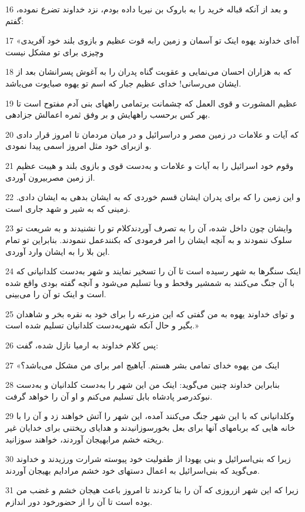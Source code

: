 \par 16 و بعد از آنکه قباله خرید را به باروک بن نیریا داده بودم، نزد خداوند تضرع نموده، گفتم:
\par 17 «آه‌ای خداوند یهوه اینک تو آسمان و زمین رابه قوت عظیم و بازوی بلند خود آفریدی وچیزی برای تو مشکل نیست
\par 18 که به هزاران احسان می‌نمایی و عقوبت گناه پدران را به آغوش پسرانشان بعد از ایشان می‌رسانی! خدای عظیم جبار که اسم تو یهوه صبایوت می‌باشد.
\par 19 عظیم المشورت و قوی العمل که چشمانت برتمامی راههای بنی آدم مفتوح است تا بهر کس برحسب راههایش و بر وفق ثمره اعمالش جزادهی.
\par 20 که آیات و علامات در زمین مصر و دراسرائیل و در میان مردمان تا امروز قرار دادی و ازبرای خود مثل امروز اسمی پیدا نمودی.
\par 21 وقوم خود اسرائیل را به آیات و علامات و به‌دست قوی و بازوی بلند و هیبت عظیم از زمین مصربیرون آوردی.
\par 22 و این زمین را که برای پدران ایشان قسم خوردی که به ایشان بدهی به ایشان دادی. زمینی که به شیر و شهد جاری است.
\par 23 وایشان چون داخل شده، آن را به تصرف آوردندکلام تو را نشنیدند و به شریعت تو سلوک ننمودند و به آنچه ایشان را امر فرمودی که بکنندعمل ننمودند. بنابراین تو تمام این بلا را به ایشان وارد آوردی.
\par 24 اینک سنگرها به شهر رسیده است تا آن را تسخیر نمایند و شهر به‌دست کلدانیانی که با آن جنگ می‌کنند به شمشیر وقحط و وبا تسلیم می‌شود و آنچه گفته بودی واقع شده است و اینک تو آن را می‌بینی.
\par 25 و تو‌ای خداوند یهوه به من گفتی که این مزرعه را برای خود به نقره بخر و شاهدان بگیر و حال آنکه شهربه‌دست کلدانیان تسلیم شده است.»
\par 26 پس کلام خداوند به ارمیا نازل شده، گفت:
\par 27 «اینک من یهوه خدای تمامی بشر هستم. آیاهیچ امر برای من مشکل می‌باشد؟
\par 28 بنابراین خداوند چنین می‌گوید: اینک من این شهر را به‌دست کلدانیان و به‌دست نبوکدرصر پادشاه بابل تسلیم می‌کنم و او آن را خواهد گرفت.
\par 29 وکلدانیانی که با این شهر جنگ می‌کنند آمده، این شهر را آتش خواهند زد و آن را با خانه هایی که بربامهای آنها برای بعل بخور‌سوزانیدند و هدایای ریختنی برای خدایان غیر ریخته خشم مرابهیجان آوردند، خواهند سوزانید.
\par 30 زیرا که بنی‌اسرائیل و بنی یهودا از طفولیت خود پیوسته شرارت ورزیدند و خداوند می‌گوید که بنی‌اسرائیل به اعمال دستهای خود خشم مرادایم بهیجان آوردند.
\par 31 زیرا که این شهر ازروزی که آن را بنا کردند تا امروز باعث هیجان خشم و غضب من بوده است تا آن را از حضورخود دور اندازم.
